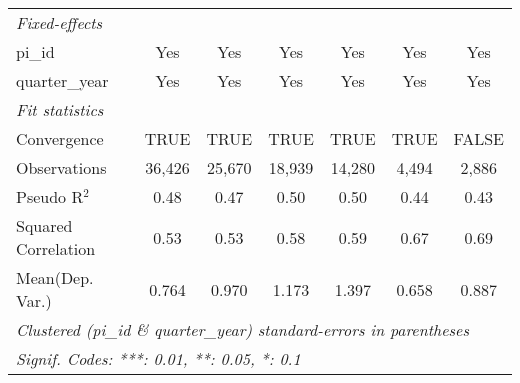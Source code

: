 \begin{tabular}{lcccccc}
   \midrule
   \emph{Fixed-effects}\\
   pi\_id                                                     & Yes            & Yes            & Yes            & Yes            & Yes           & Yes\\  
   quarter\_year                                              & Yes            & Yes            & Yes            & Yes            & Yes           & Yes\\  
   \midrule
   \emph{Fit statistics}\\
   Convergence                                                &TRUE            & TRUE           & TRUE           & TRUE           & TRUE          & FALSE\\  
   Observations                                               & 36,426         & 25,670         & 18,939         & 14,280         & 4,494         & 2,886\\  
   Pseudo R$^2$                                               & 0.48           & 0.47           & 0.50           & 0.50           & 0.44          & 0.43\\  
   Squared Correlation                                        & 0.53           & 0.53           & 0.58           & 0.59           & 0.67          & 0.69\\  
Mean(Dep. Var.) & 0.764 & 0.970 & 1.173 & 1.397 & 0.658 & 0.887 \\
   \midrule \midrule
   \multicolumn{7}{l}{\emph{Clustered (pi\_id \& quarter\_year) standard-errors in parentheses}}\\
   \multicolumn{7}{l}{\emph{Signif. Codes: ***: 0.01, **: 0.05, *: 0.1}}\\
\end{tabular}
\par\endgroup

